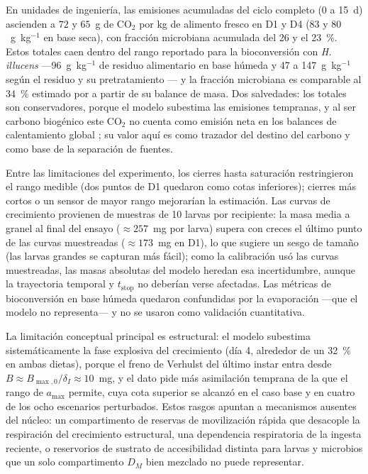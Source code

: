 En unidades de ingeniería, las emisiones acumuladas del ciclo completo (0 a 15~d) ascienden a $72$ y $65$~g de CO$_2$ por kg de alimento fresco en D1 y D4 ($83$ y $80$~g~kg$^{-1}$ en base seca), con fracción microbiana acumulada del 26 y el 23~\%. Estos totales caen dentro del rango reportado para la bioconversión con \textit{H. illucens} ---96~g~kg$^{-1}$ de residuo alimentario en base húmeda \parencite{ermolaevGreenhouseGasEmissions2019} y 47 a 147~g~kg$^{-1}$ según el residuo y su pretratamiento \parencite{lindbergProcessEfficiencyGreenhouse2022a}--- y la fracción microbiana es comparable al 34~\% estimado por \textcite{parodiBioconversionEfficienciesGreenhouse2020a} a partir de su balance de masa. Dos salvedades: los totales son conservadores, porque el modelo subestima las emisiones tempranas, y al ser carbono biogénico este CO$_2$ no cuenta como emisión neta en los balances de calentamiento global \parencite{mertenatBlackSoldierFly2019}; su valor aquí es como trazador del destino del carbono y como base de la separación de fuentes.

Entre las limitaciones del experimento, los cierres hasta saturación restringieron el rango medible (dos puntos de D1 quedaron como cotas inferiores); cierres más cortos o un sensor de mayor rango mejorarían la estimación. Las curvas de crecimiento provienen de muestras de 10 larvas por recipiente: la masa media a granel al final del ensayo ($\approx 257$~mg por larva) supera con creces el último punto de las curvas muestreadas ($\approx 173$~mg en D1), lo que sugiere un sesgo de tamaño (las larvas grandes se capturan más fácil); como la calibración usó las curvas muestreadas, las masas absolutas del modelo heredan esa incertidumbre, aunque la trayectoria temporal y $t_{\mathrm{stop}}$ no deberían verse afectadas. Las métricas de bioconversión en base húmeda quedaron confundidas por la evaporación ---que el modelo no representa--- y no se usaron como validación cuantitativa.

La limitación conceptual principal es estructural: el modelo subestima sistemáticamente la fase explosiva del crecimiento (día 4, alrededor de un 32~\% en ambas dietas), porque el freno de Verhulst del último instar entra desde $B \approx B_{\max,0}/\delta_I \approx 10$~mg, y el dato pide más asimilación temprana de la que el rango de $a_{\max}$ permite, cuya cota superior se alcanzó en el caso base y en cuatro de los ocho escenarios perturbados. Estos rasgos apuntan a mecanismos ausentes del núcleo: un compartimento de reservas de movilización rápida que desacople la respiración del crecimiento estructural, una dependencia respiratoria de la ingesta reciente, o reservorios de sustrato de accesibilidad distinta para larvas y microbios que un solo compartimento $D_M$ bien mezclado no puede representar.

